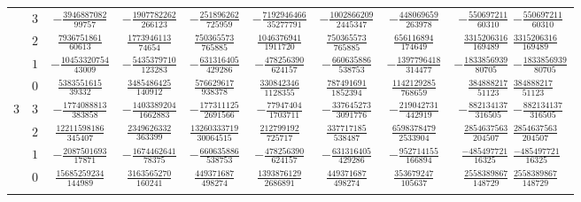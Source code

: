 \begin{table}
\begin{center}
\begin{tabular}{ccccccccc}
           &  $3$  &  $-\frac{ 3946887082}{  99757} $  &  $-\frac{ 1907782262}{  266123}$  &  $-\frac{  251896262}{  725959}$  &  $-\frac{7192946466}{35277791}$  &  $-\frac{ 1002866209}{ 2445347}$  &  $-\frac{ 448069659}{  263978} $  &  $-\frac{ 550697211}{  60310}$  $-\frac{ 550697211}{  60310}$  \\ \addlinespace
           &  $2$  &  $ \frac{ 7936751861}{  60613} $  &  $ \frac{ 1773946113}{   74654}$  &  $ \frac{  750365573}{  765885}$  &  $ \frac{1046376941}{ 1911720}$  &  $ \frac{  750365573}{  765885}$  &  $ \frac{ 656116894}{  174649} $  &  $ \frac{3315206316}{ 169489}$  $ \frac{3315206316}{ 169489}$  \\ \addlinespace
           &  $1$  &  $-\frac{10453320754}{  43009} $  &  $-\frac{ 5435379710}{  123283}$  &  $-\frac{  631316405}{  429286}$  &  $-\frac{ 478256390}{  624157}$  &  $-\frac{  660635886}{  538753}$  &  $-\frac{1397796418}{  314477} $  &  $-\frac{1833856939}{  80705}$  $-\frac{1833856939}{  80705}$  \\ \addlinespace
           &  $0$  &  $ \frac{ 5383551615}{  39332} $  &  $ \frac{ 3485486425}{  140912}$  &  $ \frac{  576629617}{  938378}$  &  $ \frac{ 330842346}{ 1128355}$  &  $ \frac{  787491691}{ 1852394}$  &  $ \frac{1142129285}{  768659} $  &  $ \frac{ 384888217}{  51123}$  $ \frac{ 384888217}{  51123}$  \\ \addlinespace
      $3$  &  $3$  &  $-\frac{ 1774088813}{ 383858} $  &  $-\frac{ 1403389204}{ 1662883}$  &  $-\frac{  177311125}{ 2691566}$  &  $-\frac{  77947404}{ 1703711}$  &  $-\frac{  337645273}{ 3091776}$  &  $-\frac{ 219042731}{  442919} $  &  $-\frac{ 882134137}{ 316505}$  $-\frac{ 882134137}{ 316505}$  \\ \addlinespace
           &  $2$  &  $ \frac{12211598186}{ 345407} $  &  $ \frac{ 2349626332}{  363399}$  &  $ \frac{13260333719}{30064515}$  &  $ \frac{ 212799192}{  725717}$  &  $ \frac{  337717185}{  538487}$  &  $ \frac{6598378479}{ 2533904} $  &  $ \frac{2854637563}{ 204507}$  $ \frac{2854637563}{ 204507}$  \\ \addlinespace
           &  $1$  &  $-\frac{ 2087501693}{  17871} $  &  $-\frac{ 1674462641}{   78375}$  &  $-\frac{  660635886}{  538753}$  &  $-\frac{ 478256390}{  624157}$  &  $-\frac{  631316405}{  429286}$  &  $-\frac{ 952714155}{  166894} $  &  $ \frac{-485497721}{  16325}$  $ \frac{-485497721}{  16325}$  \\ \addlinespace
           &  $0$  &  $ \frac{15685259234}{ 144989} $  &  $ \frac{ 3163565270}{  160241}$  &  $ \frac{  449371687}{  498274}$  &  $ \frac{1393876129}{ 2686891}$  &  $ \frac{  449371687}{  498274}$  &  $ \frac{ 353679247}{  105637} $  &  $ \frac{2558389867}{ 148729}$  $ \frac{2558389867}{ 148729}$  \\ \addlinespace

\end{tabular}
\end{center}
\end{table}
